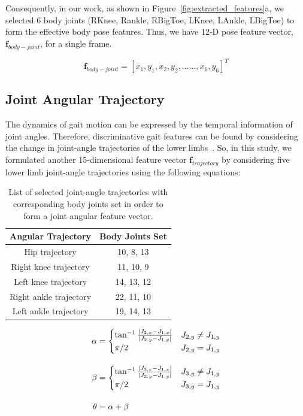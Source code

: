 Consequently, in our work, as shown in Figure~\ref{fig:extracted_features}a, we selected 6 body joints (RKnee, Rankle, RBigToe, LKnee, LAnkle, LBigToe) to form the effective body pose features. Thus, we have 12-D pose feature vector, $\textbf{f}_{body-joint}$, for a single frame. 

\begin{equation}
  \textbf {f}_{body-joint}= [x_1, y_1, x_2, y_2, \ldots\ldots, x_6, y_6]^T
\end{equation}




\subsection{Joint Angular Trajectory}
The dynamics of gait motion can be expressed by the temporal information of joint angles. Therefore, discriminative gait features can be found by considering the change in joint-angle trajectories of the lower limbs~\cite{Wang_04}. So, in this study, we formulated another 15-dimensional feature vector $\boldsymbol{f}_{trajectory}$ by considering five lower limb joint-angle trajectories using the following equations: 

\begin{table}
	\centering
	\caption{List of selected joint-angle trajectories with corresponding body joints set in order to form a joint angular feature vector. \label{table:list_joint_angle_trajectory}}
	\begin{tabular}{cc}
		\hline
		\textbf{Angular Trajectory} & \textbf{Body Joints Set}\\
		
		\hline
		Hip trajectory &10, 8, 13 \\
		Right knee trajectory  &11, 10, 9 \\
		Left knee trajectory &14, 13, 12 \\
		Right ankle trajectory &22, 11, 10 \\
		Left ankle trajectory &19, 14, 13 \\
		\hline
	\end{tabular}
\end{table}

\begin{equation}
	\begin{split}
	\alpha &= 
	\begin{cases}
	\tan^{-1}{\frac{|J_{2,x}-J_{1,x}|}{|J_{2,y}-J_{1,y}|}} & J_{2,y} \neq J_{1,y}\\
	\pi/2 & J_{2,y} = J_{1,y}
	\end{cases} \\ \noalign{\vskip10pt}
	\beta &= 
	\begin{cases}
	\tan^{-1}{\frac{|J_{3,x}-J_{1,x}|}{|J_{3,y}-J_{1,y}|}} & J_{3,y} \neq J_{1,y}\\
	\pi/2 & J_{3,y} = J_{1,y}
	\end{cases} \\ \noalign{\vskip10pt}
	\theta &= \alpha + \beta
	\end{split}
\end{equation}

